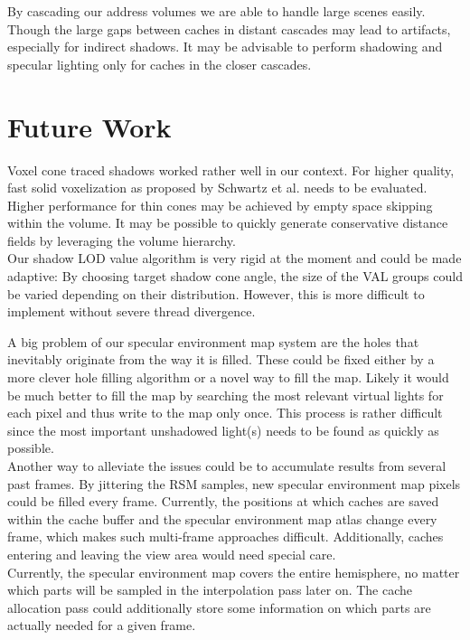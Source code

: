 \documentclass[thesis.tex]{subfiles}
\begin{document}
By cascading our address volumes we are able to handle large scenes easily.
Though the large gaps between caches in distant cascades may lead to artifacts, especially for indirect shadows.
It may be advisable to perform shadowing and specular lighting only for caches in the closer cascades.


\section{Future Work}
Voxel cone traced shadows worked rather well in our context.
For higher quality, fast solid voxelization as proposed by Schwartz et al. \cite{bib:solidvoxelization} needs to be evaluated.
Higher performance for thin cones may be achieved by empty space skipping within the volume.
It may be possible to quickly generate conservative distance fields by leveraging the volume hierarchy.
\\
Our shadow LOD value algorithm is very rigid at the moment and could be made adaptive:
By choosing target shadow cone angle, the size of the VAL groups could be varied depending on their distribution.
However, this is more difficult to implement without severe thread divergence.

A big problem of our specular environment map system are the holes that inevitably originate from the way it is filled.
These could be fixed either by a more clever hole filling algorithm or a novel way to fill the map.
Likely it would be much better to fill the map by searching the most relevant virtual lights for each pixel and thus write to the map only once.
This process is rather difficult since the most important unshadowed light(s) needs to be found as quickly as possible.
\\
Another way to alleviate the issues could be to accumulate results from several past frames.
By jittering the RSM samples, new specular environment map pixels could be filled every frame.
Currently, the positions at which caches are saved within the cache buffer and the specular environment map atlas change every frame, which makes such multi-frame approaches difficult.
Additionally, caches entering and leaving the view area would need special care.
\\
Currently, the specular environment map covers the entire hemisphere, no matter which parts will be sampled in the interpolation pass later on.
The cache allocation pass could additionally store some information on which parts are actually needed for a given frame.
\end{document}
